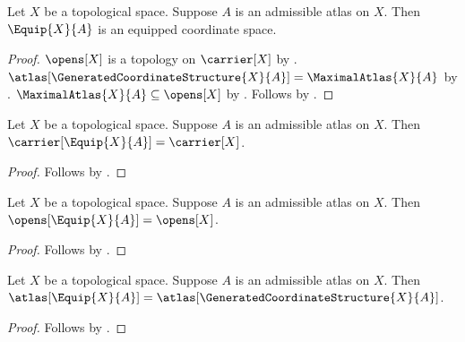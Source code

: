 \begin{classification}\label{equip_result}
    Let $X$ be a topological space.
    Suppose $A$ is an admissible atlas on $X$.
    Then $\Equip{X}{A}$ is an equipped coordinate space.
\end{classification}
\begin{proof}
    $\opens[X]$ is a topology on $\carrier[X]$
        by .
    $\atlas[\GeneratedCoordinateStructure{X}{A}]=\MaximalAtlas{X}{A}$
        by .
    $\MaximalAtlas{X}{A}\subseteq\opens[X]$
        by .
    Follows by .
\end{proof}

\begin{proposition}\label{equipprojection_carrier}
    Let $X$ be a topological space.
    Suppose $A$ is an admissible atlas on $X$.
    Then $\carrier[\Equip{X}{A}]=\carrier[X]$.
\end{proposition}
\begin{proof}
    Follows by .
\end{proof}

\begin{proposition}\label{equipprojection_opens}
    Let $X$ be a topological space.
    Suppose $A$ is an admissible atlas on $X$.
    Then $\opens[\Equip{X}{A}]=\opens[X]$.
\end{proposition}
\begin{proof}
    Follows by .
\end{proof}

\begin{proposition}\label{equipprojection_atlas}
    Let $X$ be a topological space.
    Suppose $A$ is an admissible atlas on $X$.
    Then $\atlas[\Equip{X}{A}]=\atlas[\GeneratedCoordinateStructure{X}{A}]$.
\end{proposition}
\begin{proof}
    Follows by .
\end{proof}

